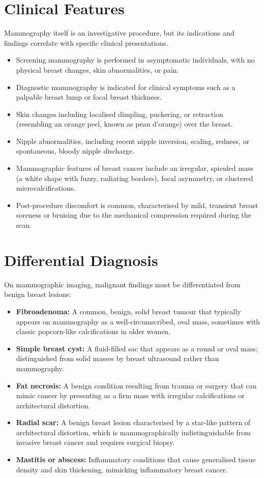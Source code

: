 \section*{Clinical Features}
Mammography itself is an investigative procedure, but its indications and findings correlate with specific clinical presentations.
\begin{itemize}
    \item Screening mammography is performed in asymptomatic individuals, with no physical breast changes, skin abnormalities, or pain.
    \item Diagnostic mammography is indicated for clinical symptoms such as a palpable breast lump or focal breast thickness.
    \item Skin changes including localised dimpling, puckering, or retraction (resembling an orange peel, known as peau d'orange) over the breast.
    \item Nipple abnormalities, including recent nipple inversion, scaling, redness, or spontaneous, bloody nipple discharge.
    \item Mammographic features of breast cancer include an irregular, spiculed mass (a white shape with fuzzy, radiating borders), focal asymmetry, or clustered microcalcifications.
    \item Post-procedure discomfort is common, characterised by mild, transient breast soreness or bruising due to the mechanical compression required during the scan.
\end{itemize}

\section*{Differential Diagnosis}
On mammographic imaging, malignant findings must be differentiated from benign breast lesions:
\begin{itemize}
    \item \textbf{Fibroadenoma:} A common, benign, solid breast tumour that typically appears on mammography as a well-circumscribed, oval mass, sometimes with classic popcorn-like calcifications in older women.
    \item \textbf{Simple breast cyst:} A fluid-filled sac that appears as a round or oval mass; distinguished from solid masses by breast ultrasound rather than mammography.
    \item \textbf{Fat necrosis:} A benign condition resulting from trauma or surgery that can mimic cancer by presenting as a firm mass with irregular calcifications or architectural distortion.
    \item \textbf{Radial scar:} A benign breast lesion characterised by a star-like pattern of architectural distortion, which is mammographically indistinguishable from invasive breast cancer and requires surgical biopsy.
    \item \textbf{Mastitis or abscess:} Inflammatory conditions that cause generalised tissue density and skin thickening, mimicking inflammatory breast cancer.
\end{itemize}

